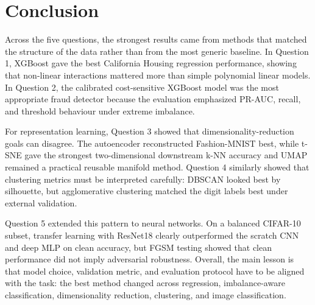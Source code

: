 \section{Conclusion}

Across the five questions, the strongest results came from methods that matched the structure of the data rather than from the most generic baseline. In Question 1, XGBoost gave the best California Housing regression performance, showing that non-linear interactions mattered more than simple polynomial linear models. In Question 2, the calibrated cost-sensitive XGBoost model was the most appropriate fraud detector because the evaluation emphasized PR-AUC, recall, and threshold behaviour under extreme imbalance.

For representation learning, Question 3 showed that dimensionality-reduction goals can disagree. The autoencoder reconstructed Fashion-MNIST best, while t-SNE gave the strongest two-dimensional downstream k-NN accuracy and UMAP remained a practical reusable manifold method. Question 4 similarly showed that clustering metrics must be interpreted carefully: DBSCAN looked best by silhouette, but agglomerative clustering matched the digit labels best under external validation.

Question 5 extended this pattern to neural networks. On a balanced CIFAR-10 subset, transfer learning with ResNet18 clearly outperformed the scratch CNN and deep MLP on clean accuracy, but FGSM testing showed that clean performance did not imply adversarial robustness. Overall, the main lesson is that model choice, validation metric, and evaluation protocol have to be aligned with the task: the best method changed across regression, imbalance-aware classification, dimensionality reduction, clustering, and image classification.
